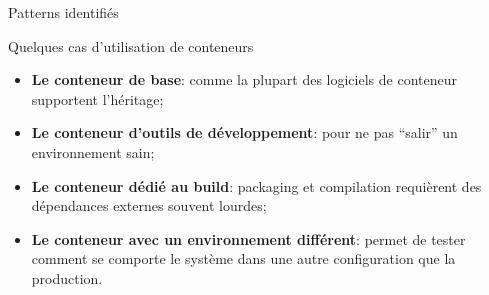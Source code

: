 \begin{frame}{Patterns identifiés}
    \begin{block}{Quelques cas d'utilisation de conteneurs}
        \begin{itemize}
            \item \textbf{Le conteneur de base}: comme la plupart des logiciels de conteneur supportent l'héritage;
            \item \textbf{Le conteneur d'outils de développement}: pour ne pas \enquote{salir} un environnement sain;
            \item \textbf{Le conteneur dédié au build}: packaging et compilation requièrent des dépendances externes souvent lourdes;
            \item \textbf{Le conteneur avec un environnement différent}: permet de tester comment se comporte le système dans une autre configuration que la production.
        \end{itemize}
    \end{block}
\end{frame}
